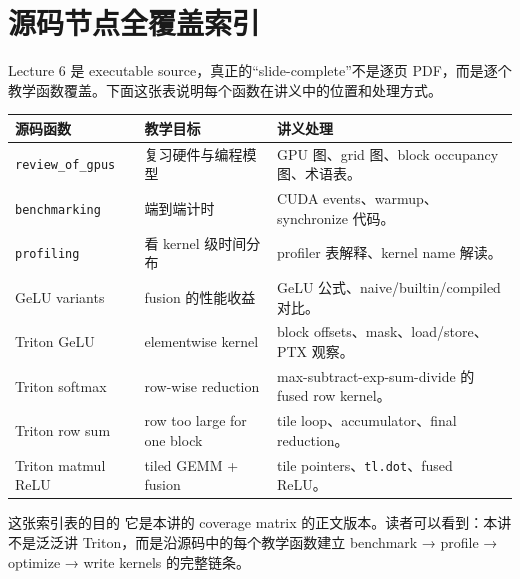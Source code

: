 \section{源码节点全覆盖索引}

Lecture 6 是 executable source，真正的“slide-complete”不是逐页 PDF，而是逐个教学函数覆盖。下面这张表说明每个函数在讲义中的位置和处理方式。

\begin{longtable}{p{}p{}p{}}
\toprule
\textbf{源码函数} & \textbf{教学目标} & \textbf{讲义处理} \\
\midrule
\texttt{review\_of\_gpus} & 复习硬件与编程模型 & GPU 图、grid 图、block occupancy 图、术语表。 \\
\texttt{benchmarking} & 端到端计时 & CUDA events、warmup、synchronize 代码。 \\
\texttt{profiling} & 看 kernel 级时间分布 & profiler 表解释、kernel name 解读。 \\
GeLU variants & fusion 的性能收益 & GeLU 公式、naive/builtin/compiled 对比。 \\
Triton GeLU & elementwise kernel & block offsets、mask、load/store、PTX 观察。 \\
Triton softmax & row-wise reduction & max-subtract-exp-sum-divide 的 fused row kernel。 \\
Triton row sum & row too large for one block & tile loop、accumulator、final reduction。 \\
Triton matmul ReLU & tiled GEMM + fusion & tile pointers、\texttt{tl.dot}、fused ReLU。 \\
\bottomrule
\end{longtable}

\begin{importantbox}{这张索引表的目的}
它是本讲的 coverage matrix 的正文版本。读者可以看到：本讲不是泛泛讲 Triton，而是沿源码中的每个教学函数建立 benchmark → profile → optimize → write kernels 的完整链条。
\end{importantbox}

